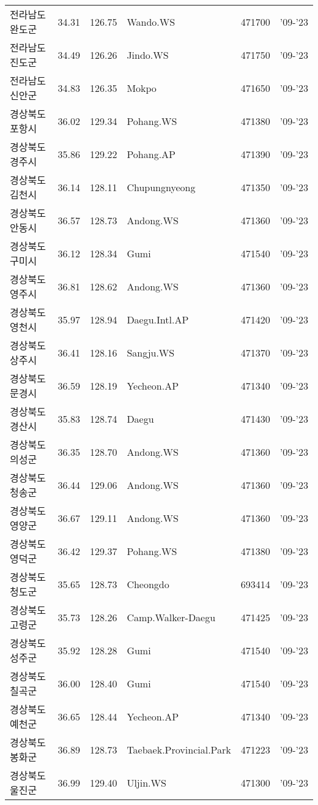 \begin{longtable}{lcclcc}
  전라남도 완도군 & 34.31 & 126.75 & Wando.WS & 471700 & '09-'23 \\
  전라남도 진도군 & 34.49 & 126.26 & Jindo.WS & 471750 & '09-'23 \\
  전라남도 신안군 & 34.83 & 126.35 & Mokpo & 471650 & '09-'23 \\
  경상북도 포항시 & 36.02 & 129.34 & Pohang.WS & 471380 & '09-'23 \\
  경상북도 경주시 & 35.86 & 129.22 & Pohang.AP & 471390 & '09-'23 \\
  경상북도 김천시 & 36.14 & 128.11 & Chupungnyeong & 471350 & '09-'23 \\
  경상북도 안동시 & 36.57 & 128.73 & Andong.WS & 471360 & '09-'23 \\
  경상북도 구미시 & 36.12 & 128.34 & Gumi & 471540 & '09-'23 \\
  경상북도 영주시 & 36.81 & 128.62 & Andong.WS & 471360 & '09-'23 \\
  경상북도 영천시 & 35.97 & 128.94 & Daegu.Intl.AP & 471420 & '09-'23 \\
  경상북도 상주시 & 36.41 & 128.16 & Sangju.WS & 471370 & '09-'23 \\
  경상북도 문경시 & 36.59 & 128.19 & Yecheon.AP & 471340 & '09-'23 \\
  경상북도 경산시 & 35.83 & 128.74 & Daegu & 471430 & '09-'23 \\
  경상북도 의성군 & 36.35 & 128.70 & Andong.WS & 471360 & '09-'23 \\
  경상북도 청송군 & 36.44 & 129.06 & Andong.WS & 471360 & '09-'23 \\
  경상북도 영양군 & 36.67 & 129.11 & Andong.WS & 471360 & '09-'23 \\
  경상북도 영덕군 & 36.42 & 129.37 & Pohang.WS & 471380 & '09-'23 \\
  경상북도 청도군 & 35.65 & 128.73 & Cheongdo & 693414 & '09-'23 \\
  경상북도 고령군 & 35.73 & 128.26 & Camp.Walker-Daegu & 471425 & '09-'23 \\
  경상북도 성주군 & 35.92 & 128.28 & Gumi & 471540 & '09-'23 \\
  경상북도 칠곡군 & 36.00 & 128.40 & Gumi & 471540 & '09-'23 \\
  경상북도 예천군 & 36.65 & 128.44 & Yecheon.AP & 471340 & '09-'23 \\
  경상북도 봉화군 & 36.89 & 128.73 & Taebaek.Provincial.Park & 471223 & '09-'23 \\
  경상북도 울진군 & 36.99 & 129.40 & Uljin.WS & 471300 & '09-'23 \\

\end{longtable}
